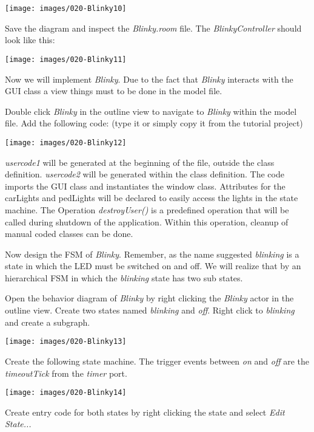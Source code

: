 \texttt{[image: images/020-Blinky10]}

Save the diagram and inspect the \textit{Blinky.room} file. The \textit{BlinkyController} should look like this:

\texttt{[image: images/020-Blinky11]}
 
Now we will implement \textit{Blinky}. Due to the fact that \textit{Blinky} interacts with the GUI class a view things must to be done in the model file.

Double click \textit{Blinky} in the outline view to navigate to \textit{Blinky} within the model file.
Add the following code:
(type it or simply copy it from the tutorial project)

\texttt{[image: images/020-Blinky12]}

\textit{usercode1} will be generated at the beginning of the file, outside the class definition. \textit{usercode2} will be generated within the class definition. The code imports the GUI class and instantiates the window class. Attributes for the carLights and pedLights will be declared to easily access the lights in the state machine.
The Operation \textit{destroyUser()} is a predefined operation that will be called during shutdown of the application. Within this operation, cleanup of manual coded classes can be done.
 
Now design the FSM of \textit{Blinky}. Remember, as the name suggested \textit{blinking} is a state in which the LED must be switched on and off. We will realize that by an hierarchical FSM in which the \textit{blinking} state has two sub states.

Open the behavior diagram of \textit{Blinky} by right clicking the \textit{Blinky} actor in the outline view. Create two states named \textit{blinking} and \textit{off}. Right click to \textit{blinking} and create a subgraph.

\texttt{[image: images/020-Blinky13]}

Create the following state machine. The trigger events between \textit{on} and \textit{off} are the \textit{timeoutTick} from the \textit{timer} port. 

\texttt{[image: images/020-Blinky14]}

Create entry code for both states by right clicking the state and select \textit{Edit State...}

